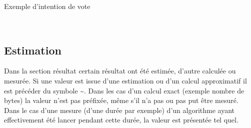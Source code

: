 \documentclass[../report]{subfiles}
\begin{document}
  \begin{table}[h]
  	\begin{center}
  		\caption{Exemple d'intention de vote}%
  		\label{fig:intro:notation:note-A}
  		\\[1em]
  	\end{center}
  \end{table}
  
  
  
  \subsection{Estimation}\label{sec:intro:notation:estimation}
  
  Dans la section résultat certain résultat ont été estimée, d'autre calculée ou mesurée.
  Si une valeur est issue d'une estimation ou d'un calcul approximatif il est précéder du symbole \textasciitilde.
  Dans les cas d'un calcul exact (exemple nombre de bytes) la valeur n'est pas préfixée, même s'il n'a pas ou pas put être mesuré.
  Dans le cas d'une mesure (d'une durée par exemple) d'un algorithme ayant effectivement été lancer pendant cette durée, la valeur est présentée tel quel.
\end{document}
